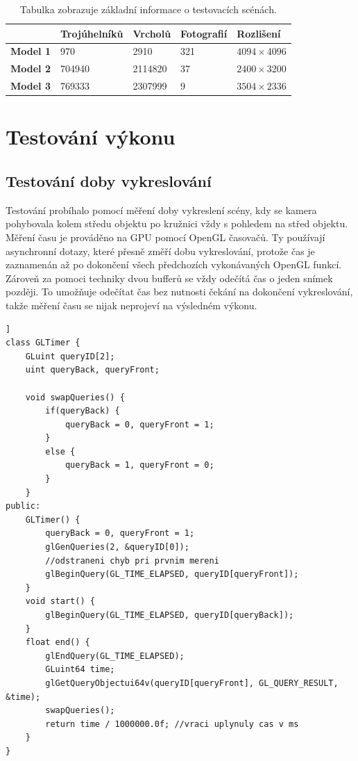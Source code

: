 \documentclass[11pt,twoside,a4paper]{book}
\begin{document}
\begin{table}[h]
\begin{center}
%
\begin{tabularx}{\textwidth}{|l|R|R|R|R|}
\hline
 & \textbf{Trojúhelníků} &\textbf{Vrcholů} & \textbf{Fotografií} & \textbf{Rozlišení} \\ \hline
\textbf{Model 1} & 970 & 2910 & 321 & $4094\times4096$ \\ \hline
\textbf{Model 2} & 704940 & 2114820 & 37 & $2400\times3200$ \\ \hline
\textbf{Model 3} & 769333 & 2307999 & 9 & $3504\times2336$ \\ \hline
\end{tabularx}
\caption{Tabulka zobrazuje základní informace o testovacích scénách.}
\label{tab:scenes}

\end{center}
\end{table}

\newpage %
\section{Testování výkonu}

\subsection{Testování doby vykreslování}

Testování probíhalo pomocí měření doby vykreslení scény, kdy se kamera pohybovala kolem středu objektu po kružnici vždy s pohledem na střed objektu. Měření času je prováděno na GPU pomocí OpenGL časovačů. Ty používají asynchronní dotazy, které přesně změří dobu vykreslování, protože čas je zaznamenán až po dokončení všech předchozích vykonávaných OpenGL funkcí. Zároveň za pomoci techniky dvou bufferů se vždy odečítá čas o jeden snímek později. To umožňuje odečítat čas bez nutnosti čekání na dokončení vykreslování, takže měření času se nijak neprojeví na výsledném výkonu.

\begin{lstlisting}[caption={Asynchroní měření času na GPU.},firstnumber=1,label={code:time},float=[ht]]
class GLTimer {
	GLuint queryID[2];
	uint queryBack, queryFront;
		
	void swapQueries() {
		if(queryBack) {
			queryBack = 0, queryFront = 1;
		}
		else {
			queryBack = 1, queryFront = 0;
		}
	}
public:
	GLTimer() {
		queryBack = 0, queryFront = 1;
		glGenQueries(2, &queryID[0]);
		//odstraneni chyb pri prvnim mereni
		glBeginQuery(GL_TIME_ELAPSED, queryID[queryFront]); 
	}
	void start() {
		glBeginQuery(GL_TIME_ELAPSED, queryID[queryBack]);
	}
	float end() {
		glEndQuery(GL_TIME_ELAPSED);
		GLuint64 time;
		glGetQueryObjectui64v(queryID[queryFront], GL_QUERY_RESULT, &time);
		swapQueries();
		return time / 1000000.0f; //vraci uplynuly cas v ms
	}
}
\end{lstlisting}
\end{document}
